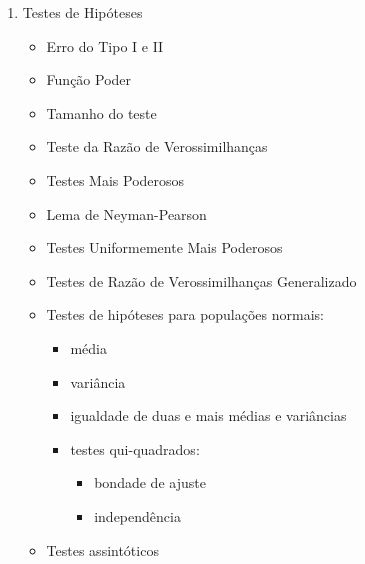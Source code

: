 \begin{enumerate}
\begin{itemize}
    \end{itemize}
  \item {Testes de Hipóteses}
    \begin{itemize}
      \item {Erro do Tipo I e II}
      \item {Função Poder}
      \item {Tamanho do teste}
      \item {Teste da Razão de Verossimilhanças}
      \item {Testes Mais Poderosos}
      \item {Lema de Neyman-Pearson}
      \item {Testes Uniformemente Mais Poderosos}
      \item {Testes de Razão de Verossimilhanças Generalizado}
      \item {Testes de hipóteses para populações normais:} 
      \begin{itemize}
        \item {média}
        \item {variância}
        \item {igualdade de duas e mais médias e variâncias}
        \item {testes qui-quadrados:} 
        \begin{itemize}
          \item {bondade de ajuste}
          \item {independência}
        \end{itemize}
      \end{itemize}
      \item {Testes assintóticos}
    \end{itemize}
\end{enumerate}


